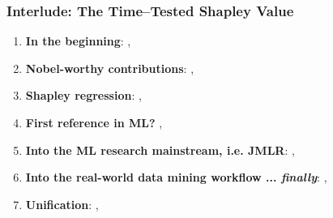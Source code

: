 \documentclass[11pt,
               aspectratio=169,
               hyperref={colorlinks}
               ]{beamer}
\begin{document}
			\begin{frame}
		
				\frametitle{Interlude: The Time--Tested Shapley Value}		
			
				\begin{enumerate}
				
					\item \textbf{In the beginning}: , 
					\item \textbf{Nobel-worthy contributions}: , 
					\item \textbf{Shapley regression}: , 
					\item \textbf{First reference in ML?} ,  	
					\item \textbf{Into the ML research mainstream, i.e. JMLR}: , 
					\item \textbf{Into the real-world data mining workflow ... \textit{finally}}: , 	
					\item \textbf{Unification}: , 	
				
				\end{enumerate}
			
			\end{frame}
	
\end{document}
